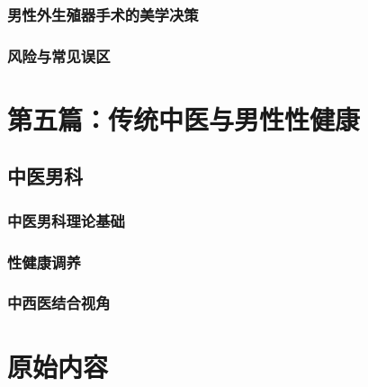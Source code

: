 \section{男性外生殖器手术的美学决策}

\section{风险与常见误区}

\part*{第五篇：传统中医与男性性健康}

\chapter{中医男科}

\section{中医男科理论基础}

\section{性健康调养}

\section{中西医结合视角}


\part*{原始内容}

